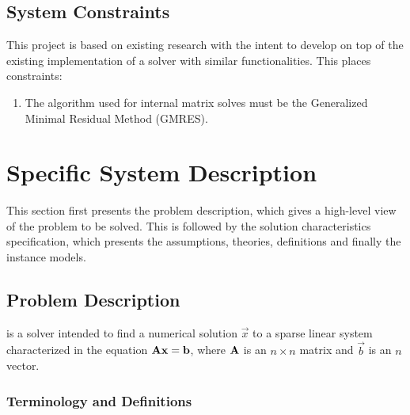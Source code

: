 \documentclass[12pt]{article}
\begin{document}
\subsection{System Constraints}

This project is based on existing research with the intent to develop on top of
the existing implementation of a solver with similar functionalities. This
places constraints:

\begin{enumerate}
\item The algorithm used for internal matrix solves must be the Generalized Minimal
  Residual Method (GMRES).
\end{enumerate}

\section{Specific System Description}

This section first presents the problem description, which gives a high-level
view of the problem to be solved.  This is followed by the solution characteristics
specification, which presents the assumptions, theories, definitions and finally
the instance models.  

\subsection{Problem Description} \label{Sec_pd}

\progname{} is a solver intended to find a numerical solution \(\vec{x}\) to a sparse
linear system characterized in the equation \(\mathbf{A}\mathbf{x} = \mathbf{b}\), where
\(\mathbf{A}\) is an \(n \times n\) matrix and \(\vec{b}\) is an \(n\) vector.

\subsubsection{Terminology and Definitions}


\end{document}
